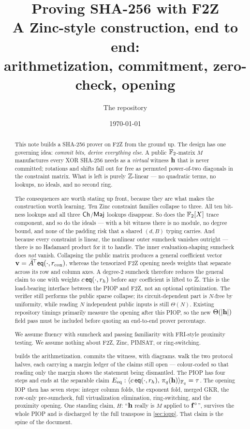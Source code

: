 \documentclass[11pt,letterpaper]{article}
\title{\textbf{Proving SHA-256 with F2Z}\\[3pt]
  \large A Zinc\raisebox{0.1ex}{+}-style construction, end to end:\\
  arithmetization, commitment, zero-check, opening}
\author{The \code{f2z-pcs} repository}
\date{\today}
\theoremstyle{definition}
\theoremstyle{plain}
\begin{document}
\maketitle

\begin{abstract}
\noindent
This note builds a SHA-256 prover on F2Z from the ground up. The design has one
governing idea: \emph{commit bits, derive everything else}. A public
$\mathbb{F}_2$-matrix $M$ manufactures every XOR SHA-256 needs as a \emph{virtual}
witness $\mathbf{h}$ that is never committed; rotations and shifts fall out for free as
permuted power-of-two diagonals in the constraint matrix. What is left is purely
$\mathbb{Z}$-linear --- no quadratic terms, no lookups, no ideals, and no second ring.

The consequences are worth stating up front, because they are what makes the
construction worth learning. Ten Zinc\raisebox{0.1ex}{+} constraint families
collapse to three. All ten bit-ness lookups and all three
$\mathsf{Ch}$/$\mathsf{Maj}$ lookups disappear. So does the $\mathbb{F}_2[X]$ trace component, and so
do the ideals --- with a bit witness there is no module, no degree bound, and
none of the padding risk that a shared $(d,B)$ typing carries.
And because every constraint is linear, the nonlinear outer sumcheck vanishes
outright --- there is no Hadamard product for it to handle.  The inner
evaluation-shaping sumcheck does \emph{not} vanish.  Collapsing the public
matrix produces a general coefficient vector
$\mathbf{v}=\bar A^{\!\top}\mathsf{eq}(\cdot,r_{\rm con})$, whereas the tensorized F2Z opening
needs weights that separate across its row and column axes.  A degree-$2$
sumcheck therefore reduces the general claim to one with weights
$c\,\mathsf{eq}(\cdot,r_h)$ before any coefficient is lifted to $\mathbb{Z}$.  This is the
load-bearing interface between the PIOP and F2Z, not an optional optimization.
The verifier still performs the public sparse collapse; its circuit-dependent
part is $N$-free by uniformity, while reading $N$ independent public inputs is
still $\Theta(N)$.  Existing repository timings primarily measure the opening
after this PIOP, so the new $\Theta(|\mathbf{h}|)$ field pass must be included before
quoting an end-to-end prover percentage.

We assume fluency with sumcheck and passing familiarity with FRI-style
proximity testing. We assume nothing about F2Z, Zinc\raisebox{0.1ex}{+},
PIMSAT, or ring-switching.

 builds the arithmetization.  commits the
witness, with diagrams.  walk the two protocol halves,
each carrying a margin ledger of the claims still open --- colour-coded so that
reading only the margin shows the statement being dismantled.  The PIOP has
four steps and ends at the separable claim
$E_{\rm eq}:\langle c\,\mathsf{eq}(\cdot,r_h),\, \pi_q(\mathbf{h})\rangle_{\mathbb{F}_q}=\tau$.  The opening IOP then
has seven steps: integer column folds, the exponent fold, merged GKR, the
row-only pre-sumcheck, full virtualization elimination, ring-switching, and the
proximity opening.  One standing claim, $H$: ``$\mathbf{h}$ really is $M$ applied to
$\mathbf{f}^{\circ}$'', survives the whole PIOP and is discharged by the full
transpose in \cref{sec:iopp}. That claim is the spine of the document.
\end{abstract}
\end{document}
